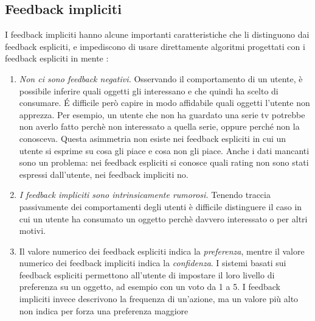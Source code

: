 \subsection{Feedback impliciti}
I feedback impliciti hanno alcune importanti caratteristiche che li distinguono dai feedback espliciti, e impediscono di usare direttamente algoritmi progettati con i feedback espliciti in mente \cite{als}:
\begin{enumerate}
 \item \textit{Non ci sono feedback negativi.} Osservando il comportamento di un utente, è possibile inferire quali oggetti gli interessano e che quindi ha scelto di consumare. \'E difficile però capire in modo affidabile quali oggetti l'utente non apprezza. Per esempio, un utente che non ha guardato una serie tv potrebbe non averlo fatto perchè non interessato a quella serie, oppure perché non la conosceva. Questa asimmetria non esiste nei feedback espliciti in cui un utente si esprime su cosa gli piace e cosa non gli piace. Anche i dati mancanti sono un problema: nei feedback espliciti si conosce quali rating non sono stati espressi dall'utente, nei feedback impliciti no.
 
 \item \textit{I feedback impliciti sono intrinsicamente rumorosi.} Tenendo traccia passivamente dei comportamenti degli utenti è difficile distinguere il caso in cui un utente ha consumato un oggetto perchè davvero interessato o per altri motivi.
 
 \item Il valore numerico dei feedback espliciti indica la \textit{preferenza}, mentre il valore numerico dei feedback impliciti indica la \textit{confidenza}. I sistemi basati sui feedback espliciti permettono all'utente di impostare il loro livello di preferenza su un oggetto, ad esempio con un voto da 1 a 5. I feedback impliciti invece descrivono la frequenza di un'azione, ma un valore più alto  non indica per forza una preferenza maggiore
\end{enumerate}

